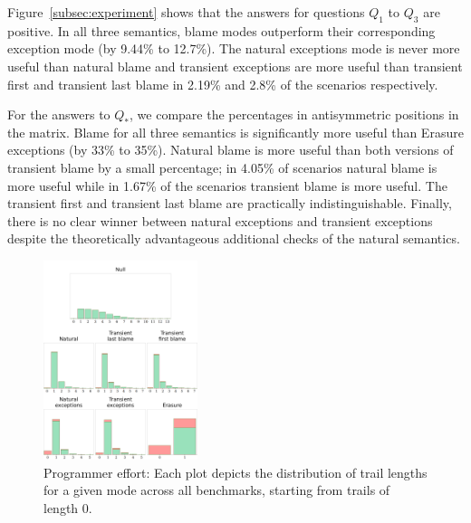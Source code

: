 Figure~\ref{subsec:experiment} shows that the answers for questions $Q_1$
to $Q_3$ are positive. In all three semantics, blame modes outperform
their corresponding exception mode (by 9.44\% to 12.7\%). The natural
exceptions mode is never more useful than natural blame and  transient
exceptions are more useful than transient first and transient last blame
in 2.19\% and 2.8\% of the scenarios respectively. 


For the answers to $Q_*$, we compare the percentages in antisymmetric
positions in the matrix. Blame for all three semantics is significantly
more useful than Erasure exceptions (by 33\% to 35\%). Natural blame is
more useful than both versions of transient blame by a small percentage;
in 4.05\% of scenarios natural blame is more useful while in 1.67\% of the
scenarios transient blame is more useful. The transient first and
transient last blame are practically indistinguishable. Finally, there is
no clear winner between natural exceptions and transient exceptions
despite the theoretically advantageous additional checks of the natural
semantics. 

\begin{figure}
  \centering
  \includegraphics[width=0.4\textwidth]{./plots/bt-lengths-table}
  \caption{Programmer effort: Each plot depicts the distribution of trail
  lengths for a given mode across all benchmarks, starting from trails
  of length 0.}
  \label{fig:effort-table}
\end{figure}


